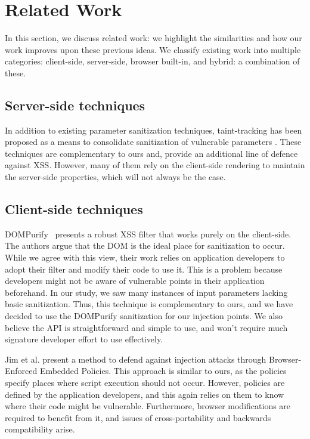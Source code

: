 \section{Related Work}
In this section, we discuss related work: we highlight the similarities and how our work improves upon these previous ideas. We classify existing work into multiple categories: client-side, server-side, browser built-in, and hybrid: a combination of these.

\subsection{Server-side techniques} In addition to existing parameter sanitization techniques, taint-tracking has been proposed as a means to consolidate sanitization of vulnerable parameters \cite{Xu:2006:TPE:1267336.1267345,DBLP:conf/sec/Nguyen-TuongGGSE05,Pietraszek:2005:DAI:2146257.2146267,Bisht:2008:XPD:1428322.1428325}. These techniques are complementary to ours and, provide an additional line of defence against \ac{XSS}. However, many of them rely on the client-side rendering to maintain the server-side properties, which will not always be the case.

\subsection{Client-side techniques} 

DOMPurify~\cite{10.1007/978-3-319-66399-9_7} presents a robust \ac{XSS} filter that works purely on the client-side. The authors argue that the DOM is the ideal place for sanitization to occur. While we agree with this view, their work relies on application developers to adopt their filter and modify their code to use it. This is a problem because developers might not be aware of vulnerable points in their application beforehand. In our study, we saw many instances of input parameters lacking basic sanitization. Thus, this technique is complementary to ours, and we have decided to use the DOMPurify sanitization for our injection points. We also believe the API is straightforward and simple to use, and won't require much signature developer effort to use effectively.

Jim et al. \cite{Jim:2007:DSI:1242572.1242654} present a method to defend against injection attacks through Browser-Enforced Embedded Policies. This approach is similar to ours, as the policies specify places where script execution should not occur. However, policies are defined by the application developers, and this again relies on them to know where their code might be vulnerable. Furthermore, browser modifications are required to benefit from it, and issues of cross-portability and backwards compatibility arise.

